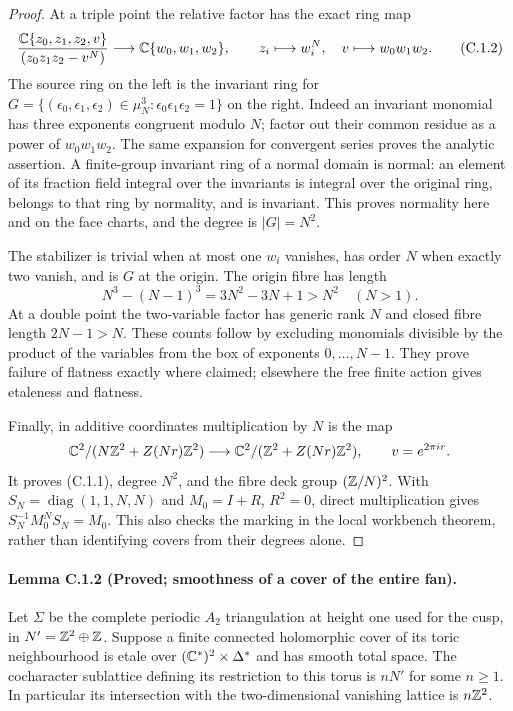 \begin{proof}
At a triple point the relative factor has the exact ring map
\[
 \frac{\mathbb C\{z_0,z_1,z_2,v\}}{(z_0z_1z_2-v^N)}
 \longrightarrow\mathbb C\{w_0,w_1,w_2\},\qquad
 z_i\longmapsto w_i^N,\quad v\longmapsto w_0w_1w_2.
 \tag{C.1.2}
\]
The source ring on the left is the invariant ring for
$G=\{(\epsilon_0,\epsilon_1,\epsilon_2)\in\mu_N^3:
\epsilon_0\epsilon_1\epsilon_2=1\}$ on the right. Indeed an invariant
monomial has three exponents congruent modulo $N$; factor out their
common residue as a power of $w_0w_1w_2$. The same expansion for convergent
series proves the analytic assertion. A finite-group invariant ring of a
normal domain is normal: an element of its fraction field integral over
the invariants is integral over the original ring, belongs to that ring
by normality, and is invariant. This proves normality here and on the
face charts, and the degree is $|G|=N^2$.

The stabilizer is trivial when at most one $w_i$ vanishes, has order $N$
when exactly two vanish, and is $G$ at the origin. The origin fibre has
length
\[
 N^3-(N-1)^3=3N^2-3N+1>N^2\quad(N>1).
\]
At a double point the two-variable factor has generic rank $N$ and
closed fibre length $2N-1>N$. These counts follow by excluding monomials
divisible by the product of the variables from the box of exponents
$0,\ldots,N-1$. They prove failure of flatness exactly where claimed;
elsewhere the free finite action gives etaleness and flatness.

Finally, in additive coordinates multiplication by $N$ is the map
\[
 \mathbb C^2/(N\mathbb Z^2+Z(Nr)\mathbb Z^2)\longrightarrow
 \mathbb C^2/(\mathbb Z^2+Z(Nr)\mathbb Z^2),\qquad v=e^{2\pi ir}.
\]
It proves (C.1.1), degree $N^2$, and the fibre deck group
$(\mathbb Z/N)^2$. With $S_N=\operatorname{diag}(1,1,N,N)$ and
$M_0=I+R$, $R^2=0$, direct multiplication gives
$S_N^{-1}M_0^NS_N=M_0$. This also checks the marking in the local
workbench theorem, rather than identifying covers from their degrees
alone.
\end{proof}

\paragraph{Lemma C.1.2 (Proved; smoothness of a cover of the entire fan).}
Let $\Sigma$ be the complete periodic $A_2$ triangulation at height one
used for the cusp, in $N'=\mathbb Z^2\oplus\mathbb Z$. Suppose a finite connected
holomorphic cover of its toric neighbourhood is etale over
$(\mathbb C^*)^2\times\Delta^*$ and has smooth total space. The cocharacter
sublattice defining its restriction to this torus is $nN'$ for some
$n\geq1$. In particular its intersection with the two-dimensional
vanishing lattice is $n\mathbb Z^2$.

